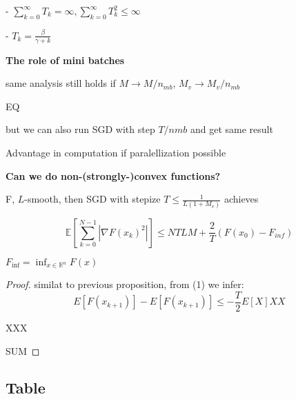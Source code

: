 - $\sum_{k=0}^{\infty}T_k = \infty,
	\sum_{k=0}^{\infty}T_k^2 \le \infty$

- $T_k=\frac{\beta}{\gamma+k}$

\textbf{The role of mini batches}

same analysis still holds if
$M\rightarrow{M/n_{mb}}$, $M_v \rightarrow{M_v/n_{mb}}$

EQ

but we can also run SGD with step $T/n{mb}$ and get same result

Advantage in computation if paralellization possible

\textbf{Can we do non-(strongly-)convex functions? }

\begin{proposition}
	F, $L$-smooth, then SGD with stepize
	$T\le \frac{1}{L(1+M_v)}$ achieves

	$$\mathbb{E}[\sum_{k=0}^{N-1}|\nabla F(x_k)^2|]
		\le NTLM + \frac{2}{T}(F(x_0)-F_{inf})$$


	$F_\text{inf} = \operatorname{inf}_{x\in\mathbb{R}^n}F(x)$
\end{proposition}

\begin{proof}[Proof] similat to  previous proposition, from (1) we infer:
	$$E[F(x_{k+1})]-E[F(x_{k+1})]\le -\frac{T}{2}E[X]XX$$

	XXX

	SUM

\end{proof}

\subsection{Table}
